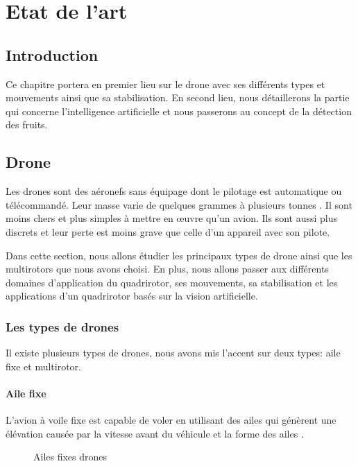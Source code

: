 \chapter{ Etat de l'art }

\clearpage
\section*{Introduction}
Ce chapitre portera en premier lieu sur le drone avec ses différents types et mouvements ainsi que sa stabilisation. En second lieu, nous détaillerons la partie qui concerne l'intelligence artificielle et nous passerons au concept de la détection des fruits. 

\section{Drone}	
Les drones sont des aéronefs sans équipage dont le pilotage est automatique ou télécommandé. Leur masse varie de quelques grammes à plusieurs tonnes  \cite{Wikipideaa}. Il sont moins chers et plus simples à mettre en œuvre qu'un avion. Ils sont aussi plus discrets et leur perte est moins grave que celle d'un appareil avec son pilote.

Dans cette section, nous allons étudier les principaux types de drone ainsi que les multirotors que nous avons choisi. En plus, nous allons passer aux différents domaines d'application du quadrirotor, ses mouvements, sa stabilisation et les applications d'un quadrirotor basés sur la vision artificielle.   	
\subsection{Les types de drones}
Il existe plusieurs types de drones, nous avons mis l'accent sur deux types: aile fixe et multirotor.

\subsubsection{Aile fixe }
L'avion à voile fixe est capable de voler en utilisant des ailes qui génèrent une élévation causée par la vitesse avant du véhicule et la forme des ailes \cite{educalingo}.


\begin{figure}[H] 
	\begin{center} 
		\centering
		
		
	\end{center}
	
	\caption{Ailes fixes drones}
\end{figure}
